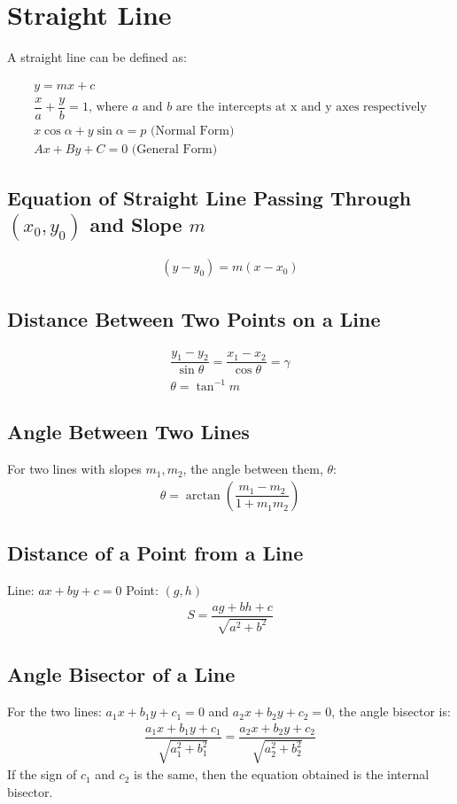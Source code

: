 \documentclass[../main.tex]{subfile}
\begin{document}
	\chapter{Straight Line}
	A straight line can be defined as:
	
	\begin{align}
		y=mx+c\\
		\dfrac{x}{a}+\dfrac{y}{b}=1\text{, where }a\text{ and }b\text{ are the intercepts at x and y axes respectively}\\
		x\cos\alpha + y\sin\alpha = p\text{ (Normal Form)}\\
		Ax+By+C=0\text{ (General Form)}
	\end{align}
	
	\section{Equation of Straight Line Passing Through $(x_0,y_0)$ and Slope $m$}
	\begin{align}
		(y-y_0)=m(x-x_0)
	\end{align}
	
	\section{Distance Between Two Points on a Line}
	\begin{align}
		\dfrac{y_1-y_2}{\sin\theta}=\dfrac{x_1-x_2}{\cos\theta}=\gamma\\
		\theta=\tan^{-1}m
	\end{align}
	
	\section{Angle Between Two Lines}
	For two lines with slopes $m_1, m_2$, the angle between them, $\theta$:
	\begin{align}
		\theta=\arctan\left(\dfrac{m_1-m_2}{1+m_1m_2}\right)
	\end{align}
	
	\section{Distance of a Point from a Line\newline}
	Line: $ax+by+c=0$
	Point: $(g,h)$
	\begin{align}
		S=\dfrac{ag+bh+c}{\sqrt{a^2+b^2}}
	\end{align}
	
	\section{Angle Bisector of a Line}
	For the two lines: $a_1x+b_1y+c_1=0$ and $a_2x+b_2y+c_2=0$, the angle bisector is:
	\begin{align}
		\dfrac{a_1x+b_1y+c_1}{\sqrt{a_1^2+b_1^2}}=\dfrac{a_2x+b_2y+c_2}{\sqrt{a_2^2+b_2^2}}
	\end{align}
	If the sign of $c_1$ and $c_2$ is the same, then the equation obtained is the internal bisector.
	
\end{document}
